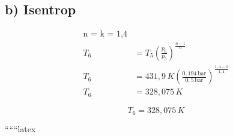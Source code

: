 \subsection*{b) Isentrop}

\begin{align*}
\text{n = k = 1,4} \\
T_6 &= T_5 \left( \frac{p_6}{p_5} \right)^{\frac{n-1}{n}} \\
T_6 &= 431,9 \, K \left( \frac{0,194 \, \text{bar}}{0,5 \, \text{bar}} \right)^{\frac{1,4-1}{1,4}} \\
T_6 &= 328,075 \, K
\end{align*}

\[
\boxed{T_6 = 328,075 \, K}
\]

``````latex